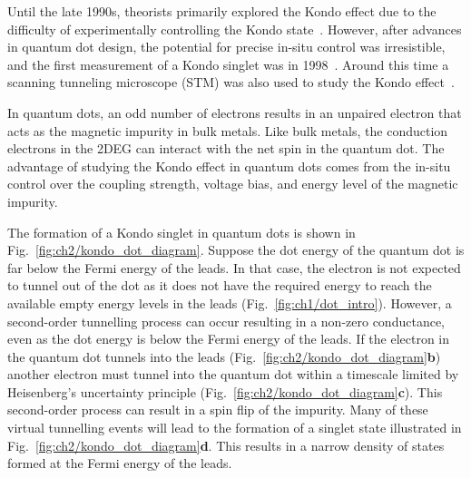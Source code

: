 Until the late 1990s, theorists primarily explored the Kondo effect due to the difficulty of experimentally controlling the Kondo state~\cite{kondo_review}. However, after advances in quantum dot design, the potential for precise in-situ control was irresistible, and the first measurement of a Kondo singlet was in 1998~\cite{goldhaber_first_kondo}. Around this time a scanning tunneling microscope (STM) was also used to study the Kondo effect~\cite{stm_kondo}.

In quantum dots, an odd number of electrons results in an unpaired electron that acts as the magnetic impurity in bulk metals. Like bulk metals, the conduction electrons in the 2DEG can interact with the net spin in the quantum dot. The advantage of studying the Kondo effect in quantum dots comes from the in-situ control over the coupling strength, voltage bias, and energy level of the magnetic impurity.

The formation of a Kondo singlet in quantum dots is shown in Fig.~\ref{fig:ch2/kondo_dot_diagram}. 
Suppose the dot energy of the quantum dot is far below the Fermi energy of the leads. In that case, the electron is not expected to tunnel out of the dot as it does not have the required energy to reach the available empty energy levels in the leads (Fig.~\ref{fig:ch1/dot_intro}). However, a second-order tunnelling process can occur resulting in a non-zero conductance, even as the dot energy is below the Fermi energy of the leads. If the electron in the quantum dot tunnels into the leads (Fig.~\ref{fig:ch2/kondo_dot_diagram}\textbf{b}) another electron must tunnel into the quantum dot within a timescale limited by Heisenberg’s uncertainty principle (Fig.~\ref{fig:ch2/kondo_dot_diagram}\textbf{c}). This second-order process can result in a spin flip of the impurity. Many of these virtual tunnelling events will lead to the formation of a singlet state illustrated in Fig.~\ref{fig:ch2/kondo_dot_diagram}\textbf{d}. This results in a narrow density of states formed at the Fermi energy of the leads. 


